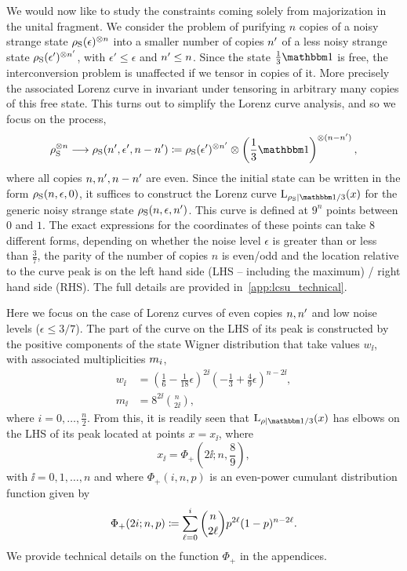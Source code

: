 \documentclass[pra,
aps,
twocolumn,
superscriptaddress,
groupedaddress,
nofootinbib,
reprint
]{revtex4-1}
\begin{document}
We would now like to study the constraints coming solely from majorization in the unital fragment. 
We consider the problem of purifying $n$ copies of a noisy strange state $\noisysn$ into a smaller number of copies $\tt$ of a less noisy strange state $\noisys(\epsilon')\too{\tt}$, with $\epsilon' \le \epsilon$ and $\tt \leq n$. 
Since the state $\frac{1}{3} \id$ is free, the interconversion problem is unaffected if we tensor in copies of it. More precisely the associated Lorenz curve in invariant under tensoring in arbitrary many copies of this free state.
This turns out to simplify the Lorenz curve analysis, and so we focus on the process,
\begin{equation}\label{eq:sudist}
	\noisys\too{n} \longrightarrow \noisys(\tt, \epsilon', n - n') \coloneqq  \noisys(\epsilon')\too{\tt} \otimes \left( \frac{1}{3}\id \right)\too{(n-\tt)},
\end{equation}
where all copies $n, \tt, n - \tt$ are even.
Since the initial state can be written in the form $\noisys(n, \epsilon, 0)$, it suffices to construct the Lorenz curve $\lc{\noisys}{\id/3}(x)$ for the generic noisy strange state $\noisys(n, \epsilon ,\tt)$.
This curve is defined at $9^n$ points between $0$ and $1$.
The exact expressions for the coordinates of these points can take $8$ different forms, depending on whether the noise level $\epsilon$ is greater than or less than $\frac{3}{7}$, the parity of the number of copies $n$ is even/odd and the location relative to the curve peak is on the left hand side (LHS -- including the maximum) / right hand side (RHS).
The full details are provided in~\cref{app:lcsu_technical}.

Here we focus on the case of Lorenz curves of even copies $n, \tt$ and low noise levels ($\epsilon \leq 3/7$).
The part of the curve on the LHS of its peak is constructed by the positive components of the state Wigner distribution that take values $w_\ii$, with associated multiplicities $\mlt_\ii$,
\begin{align}
	w_\ii &= \left( \frac{1}{6} - \frac{1}{18}\epsilon \right)^{2\ii}\left( -\frac{1}{3} + \frac{4}{9}\epsilon \right)^{n-2\ii}, \\
	m_\ii &= 8^{2\ii}\binom{n}{2\ii},
\end{align}
where $i=0,\dots,\frac{n}{2}$.
From this, it is readily seen that $\lc{\rho}{\id/3}(x)$ has elbows on the LHS of its peak located at points $x=x_\ii$, where
\begin{equation}
	x_\ii = \Phi_+ \left( 2\ii; n , \frac{8}{9} \right),
\end{equation}
with $\ii = 0,1, \dots , n$ and where $\Phi_+(i,n,p)$ is an even-power cumulant distribution function given by
\begin{equation}
	\Phi_+(2\ii; n, p) \coloneqq \sum_{\dummy=0}^{\ii} \binom{n}{2\dummy} p ^{2\dummy} (1-p)^{n-2\dummy}.
\end{equation}
We provide technical details on the function $\Phi_+$ in the appendices.
\end{document}
